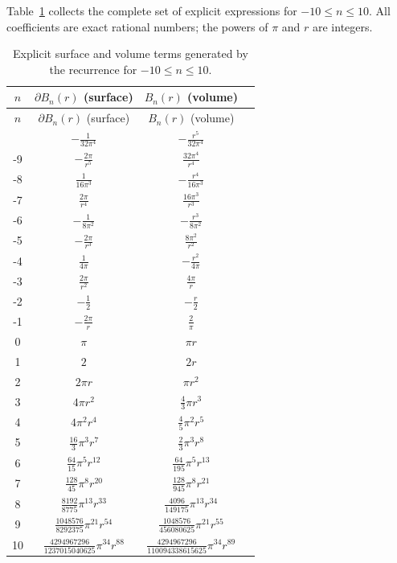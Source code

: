 \documentclass[11pt,a4paper]{article}
\theoremstyle{definition}
\begin{document}
Table~\ref{tab:full} collects the complete set of explicit expressions for \(-10\leq n\leq 10\). All coefficients are exact rational numbers; the powers of \(\pi\) and \(r\) are integers.

\begin{longtable}{@{}cccc@{}}
\caption{Explicit surface and volume terms generated by the recurrence for \(-10\leq n\leq 10\).}\label{tab:full}\\
\toprule
\(n\) & \(\partial B_n(r)\) (surface) & \(B_n(r)\) (volume) \\
\midrule
\endfirsthead
\toprule
\(n\) & \(\partial B_n(r)\) (surface) & \(B_n(r)\) (volume) \\
\midrule
\endhead
\bottomrule
\endfoot
-10 & \(-\frac{1}{32\pi^4}\) & \(-\frac{r^5}{32\pi^4}\) \\
-9 & \(-\frac{2\pi}{r^5}\) & \(\frac{32\pi^4}{r^4}\) \\
-8 & \(\frac{1}{16\pi^3}\) & \(-\frac{r^4}{16\pi^3}\) \\
-7 & \(\frac{2\pi}{r^4}\) & \(\frac{16\pi^3}{r^3}\) \\
-6 & \(-\frac{1}{8\pi^2}\) & \(-\frac{r^3}{8\pi^2}\) \\
-5 & \(-\frac{2\pi}{r^3}\) & \(\frac{8\pi^2}{r^2}\) \\
-4 & \(\frac{1}{4\pi}\) & \(-\frac{r^2}{4\pi}\) \\
-3 & \(\frac{2\pi}{r^2}\) & \(\frac{4\pi}{r}\) \\
-2 & \(-\frac12\) & \(-\frac{r}{2}\) \\
-1 & \(-\frac{2\pi}{r}\) & \(\frac{2}{\pi}\) \\
0 & \(\pi\) & \(\pi r\) \\
1 & \(2\) & \(2r\) \\
2 & \(2\pi r\) & \(\pi r^2\) \\
3 & \(4\pi r^2\) & \(\frac{4}{3}\pi r^3\) \\
4 & \(4\pi^2 r^4\) & \(\frac{4}{5}\pi^2 r^5\) \\
5 & \(\frac{16}{3}\pi^3 r^7\) & \(\frac{2}{3}\pi^3 r^8\) \\
6 & \(\frac{64}{15}\pi^5 r^{12}\) & \(\frac{64}{195}\pi^5 r^{13}\) \\
7 & \(\frac{128}{45}\pi^8 r^{20}\) & \(\frac{128}{945}\pi^8 r^{21}\) \\
8 & \(\frac{8192}{8775}\pi^{13} r^{33}\) & \(\frac{4096}{149175}\pi^{13} r^{34}\) \\
9 & \(\frac{1048576}{8292375}\pi^{21} r^{54}\) & \(\frac{1048576}{456080625}\pi^{21} r^{55}\) \\
10 & \(\frac{4294967296}{1237015040625}\pi^{34} r^{88}\) & \(\frac{4294967296}{110094338615625}\pi^{34} r^{89}\) \\
\end{longtable}
\end{document}
